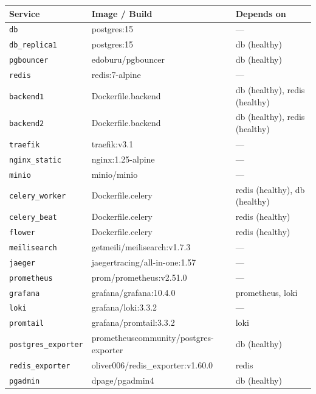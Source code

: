 \documentclass[12pt,a4paper]{article}
\begin{document}
\begin{table}[H]
\centering\scriptsize
\begin{tabularx}{\linewidth}{@{} l l X @{}}
\toprule
\textbf{Service} & \textbf{Image / Build} & \textbf{Depends on} \\
\midrule
\texttt{db}              & postgres:15                                & --- \\
\texttt{db\_replica1}    & postgres:15                                & db (healthy) \\
\texttt{pgbouncer}       & edoburu/pgbouncer                          & db (healthy) \\
\texttt{redis}           & redis:7-alpine                             & --- \\
\texttt{backend1}        & Dockerfile.backend                         & db (healthy), redis (healthy) \\
\texttt{backend2}        & Dockerfile.backend                         & db (healthy), redis (healthy) \\
\texttt{traefik}         & traefik:v3.1                               & --- \\
\texttt{nginx\_static}   & nginx:1.25-alpine                          & --- \\
\texttt{minio}           & minio/minio                                & --- \\
\texttt{celery\_worker}  & Dockerfile.celery                          & redis (healthy), db (healthy) \\
\texttt{celery\_beat}    & Dockerfile.celery                          & redis (healthy) \\
\texttt{flower}          & Dockerfile.celery                          & redis (healthy) \\
\texttt{meilisearch}     & getmeili/meilisearch:v1.7.3                & --- \\
\texttt{jaeger}          & jaegertracing/all-in-one:1.57              & --- \\
\texttt{prometheus}      & prom/prometheus:v2.51.0                    & --- \\
\texttt{grafana}         & grafana/grafana:10.4.0                     & prometheus, loki \\
\texttt{loki}            & grafana/loki:3.3.2                         & --- \\
\texttt{promtail}        & grafana/promtail:3.3.2                     & loki \\
\texttt{postgres\_exporter} & prometheuscommunity/postgres-exporter   & db (healthy) \\
\texttt{redis\_exporter} & oliver006/redis\_exporter:v1.60.0          & redis \\
\texttt{pgadmin}         & dpage/pgadmin4                             & db (healthy) \\
\bottomrule
\end{tabularx}
\end{table}
\end{document}
